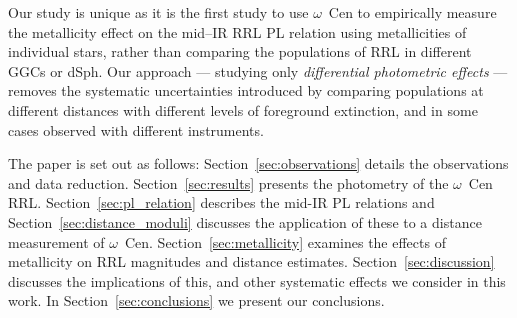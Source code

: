\documentclass[a4paper,fleqn,usenatbib]{mnras}
\newcommand{\ocen}{$\omega$~Cen\xspace}
\begin{document}
Our study is unique as it is the first study to use \ocen to empirically measure the metallicity effect on the mid--IR RRL PL relation using metallicities of individual stars, rather than comparing the populations of RRL in different GGCs or dSph. Our approach --- studying only {\it differential photometric effects} --- removes the systematic uncertainties introduced by comparing populations at different distances with different levels of foreground extinction, and in some cases observed with different instruments.

The paper is set out as follows: Section~\ref{sec:observations} details the observations and data reduction. Section~\ref{sec:results} presents the photometry of the \ocen RRL. Section~\ref{sec:pl_relation} describes the mid-IR PL relations and Section~\ref{sec:distance_moduli} discusses the application of these to a distance measurement of  \ocen. Section~\ref{sec:metallicity} examines the effects of metallicity on RRL magnitudes and distance estimates. Section~\ref{sec:discussion} discusses the implications of this, and other systematic effects we consider in this work. In Section~\ref{sec:conclusions} we present our conclusions.


\end{document}
